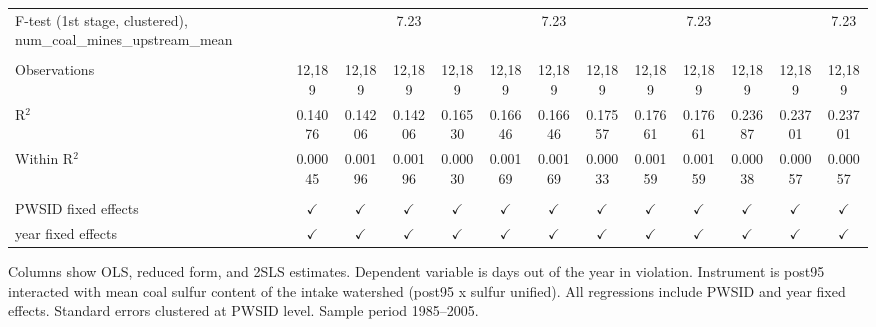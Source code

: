 \begin{table}[htbp]
\begin{adjustbox}{width = \textwidth, center}
\begin{tabular}{lcccccccccccc}
         F-test (1st stage, clustered), num\_coal\_mines\_upstream\_mean     &               &                & 7.23          &               &               & 7.23          &               &               & 7.23          &               &               & 7.23\\  
         
          \\
         
         Observations                                                        & 12,189        & 12,189         & 12,189        & 12,189        & 12,189        & 12,189        & 12,189        & 12,189        & 12,189        & 12,189        & 12,189        & 12,189\\  
         R$^2$                                                               & 0.14076       & 0.14206        & 0.14206       & 0.16530       & 0.16646       & 0.16646       & 0.17557       & 0.17661       & 0.17661       & 0.23687       & 0.23701       & 0.23701\\  
         Within R$^2$                                                        & 0.00045       & 0.00196        & 0.00196       & 0.00030       & 0.00169       & 0.00169       & 0.00033       & 0.00159       & 0.00159       & 0.00038       & 0.00057       & 0.00057\\  
         
          \\
         
         PWSID fixed effects                                                 & $\checkmark$  & $\checkmark$   & $\checkmark$  & $\checkmark$  & $\checkmark$  & $\checkmark$  & $\checkmark$  & $\checkmark$  & $\checkmark$  & $\checkmark$  & $\checkmark$  & $\checkmark$\\   
         year fixed effects                                                  & $\checkmark$  & $\checkmark$   & $\checkmark$  & $\checkmark$  & $\checkmark$  & $\checkmark$  & $\checkmark$  & $\checkmark$  & $\checkmark$  & $\checkmark$  & $\checkmark$  & $\checkmark$\\   
         
         \bottomrule
         
      \end{tabular}
      
      
      
   \end{adjustbox}
      {\tiny\linespread{1}\selectfont \par \raggedright 
   Columns show OLS, reduced form, and 2SLS estimates. Dependent variable is days out of the year in violation. Instrument is post95 interacted with mean coal sulfur content of the intake watershed (post95 x sulfur unified). All regressions include PWSID and year fixed effects. Standard errors clustered at PWSID level. Sample period 1985--2005.}
   
\end{table}


